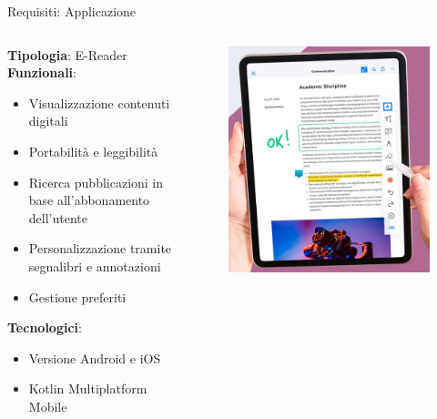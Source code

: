 \begin{frame}{Requisiti: Applicazione}
    \begin{columns}[onlytextwidth]
        \begin{column}{0.5\textwidth}
            \textbf{Tipologia}: E-Reader\\
            \vspace{5mm}
            \textbf{Funzionali}:
            \begin{itemize}
                \item Visualizzazione contenuti digitali
                \item Portabilità e leggibilità
                \item Ricerca pubblicazioni in base all'abbonamento dell'utente
                \item Personalizzazione tramite segnalibri e annotazioni
                \item Gestione preferiti
            \end{itemize}
            \vspace{5mm}
            \textbf{Tecnologici}:
            \begin{itemize}
                \item Versione Android e iOS
                \item Kotlin Multiplatform Mobile
            \end{itemize}
        \end{column}
        \begin{column}{0.45\textwidth}
             \begin{figure}[H]
                \includegraphics[width=1\textwidth]{img/e-reader.png}
            \end{figure}
        \end{column}
    \end{columns}
\end{frame}
